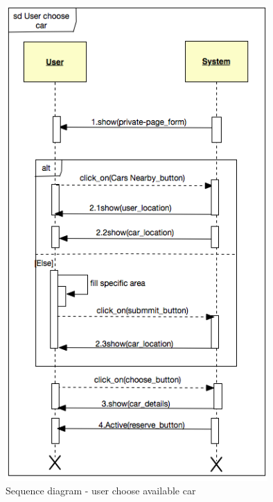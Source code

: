 \documentclass[12pt, letterpaper]{article}
\begin{document}
\begin{figure}[H]
\centering
\includegraphics[width=10cm]{userchoose.png}
\caption{Sequence diagram - user choose available car}
\end{figure}
\end{document}
